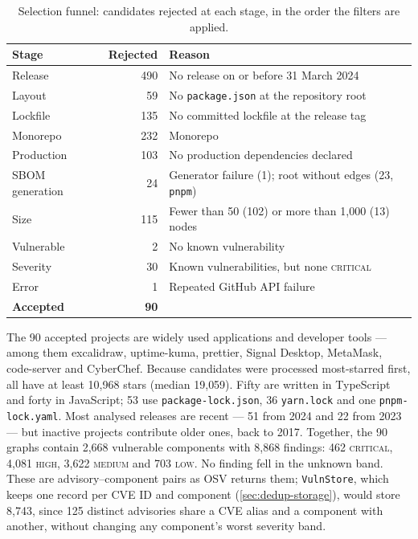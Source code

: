 \begin{table}[!htpb]
    \centering
    \small
    \caption[Selection funnel of the evaluation dataset]{Selection funnel: candidates rejected at each stage, in the order the filters are applied.}
    \label{tab:eval-funnel}
    \begin{tabular}{lrl}
        \toprule
        \textbf{Stage} & \textbf{Rejected} & \textbf{Reason} \\
        \midrule
        Release & 490 & No release on or before 31 March 2024 \\
        Layout & 59 & No \texttt{package.json} at the repository root \\
        Lockfile & 135 & No committed lockfile at the release tag \\
        Monorepo & 232 & Monorepo \\
        Production & 103 & No production dependencies declared \\
        SBOM generation & 24 & Generator failure (1); root without edges (23, \texttt{pnpm}) \\
        Size & 115 & Fewer than 50 (102) or more than 1{,}000 (13) nodes \\
        Vulnerable & 2 & No known vulnerability \\
        Severity & 30 & Known vulnerabilities, but none \textsc{critical} \\
        Error & 1 & Repeated GitHub API failure \\
        \midrule
        \textbf{Accepted} & \textbf{90} & \\
        \bottomrule
    \end{tabular}
\end{table}

The 90 accepted projects are widely used applications and developer tools --- among them excalidraw, uptime-kuma, prettier, Signal Desktop, MetaMask, code-server and CyberChef. Because candidates were processed most-starred first, all have at least 10{,}968 stars (median 19{,}059). Fifty are written in TypeScript and forty in JavaScript; 53 use \texttt{package-lock.json}, 36 \texttt{yarn.lock} and one \texttt{pnpm-lock.yaml}. Most analysed releases are recent --- 51 from 2024 and 22 from 2023 --- but inactive projects contribute older ones, back to 2017. Together, the 90 graphs contain 2{,}668 vulnerable components with 8{,}868 findings: 462 \textsc{critical}, 4{,}081 \textsc{high}, 3{,}622 \textsc{medium} and 703 \textsc{low}. No finding fell in the unknown band. These are advisory--component pairs as OSV returns them; \texttt{VulnStore}, which keeps one record per CVE ID and component (\autoref{sec:dedup-storage}), would store 8{,}743, since 125 distinct advisories share a CVE alias and a component with another, without changing any component's worst severity band.


